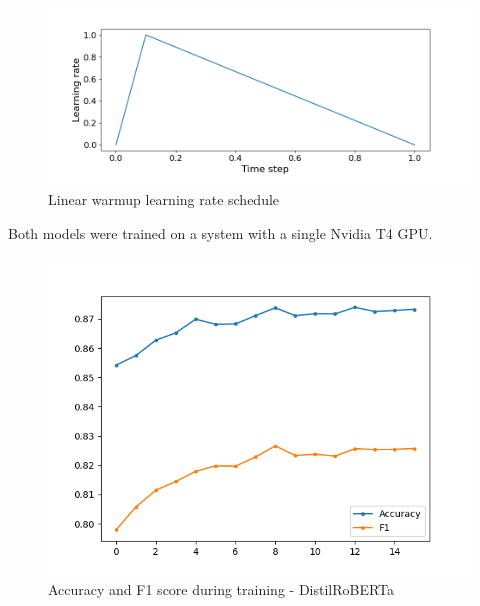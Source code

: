 \documentclass[10pt, a4paper]{article}
\begin{document}
\begin{figure}
\begin{center}
\includegraphics[width=\columnwidth]{figures/warmup-schedule.png}
\caption{Linear warmup learning rate schedule}
\label{fig:warmup-schedule}
\end{center}
\end{figure}

Both models were trained on a system with a single Nvidia T4 GPU.

\begin{figure}
\begin{center}
\includegraphics[width=\columnwidth]{figures/train-metrics-distilroberta.png}
\caption{Accuracy and F1 score during training - DistilRoBERTa}
\label{fig:train-metrics-distilroberta}
\end{center}
\end{figure}
\end{document}
